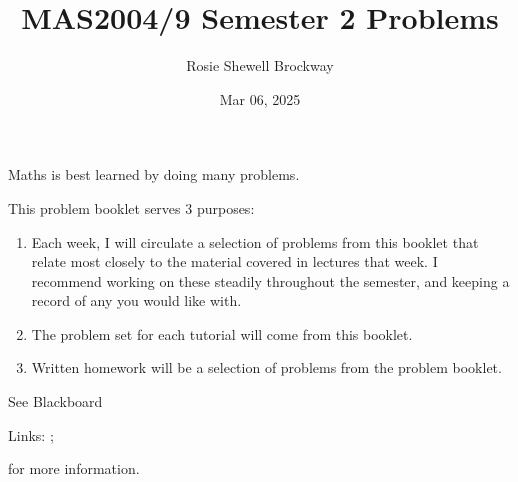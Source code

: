 \documentclass[letterpaper,10pt,english]{jupyterBook}
\title{MAS2004/9 Semester 2 Problems}
\date{Mar 06, 2025}
\author{Rosie Shewell Brockway}
\begin{document}
\pagestyle{empty}
\sphinxmaketitle
\pagestyle{plain}
\sphinxtableofcontents
\pagestyle{normal}
\label{\detokenize{intro::doc}}


\sphinxAtStartPar
Maths is best learned by doing many problems.

\sphinxAtStartPar
This problem booklet serves 3 purposes:

\label{\detokenize{intro:pow}}\begin{enumerate}
%
\item {} 
\sphinxAtStartPar
{} 
Each week, I will circulate a selection of problems from this booklet that relate most closely to the material covered in lectures that week. I recommend working on these steadily throughout the semester, and keeping a record of any you would like  with.

\item {} 
\sphinxAtStartPar
{} 
The problem set for each tutorial will come from this booklet.

\item {} 
\sphinxAtStartPar
{} 
Written homework will be a selection of problems from the problem booklet. 

\end{enumerate}

\sphinxAtStartPar
See Blackboard%
\begin{footnote}[1]\sphinxAtStartFootnote
Links: ; 
%
\end{footnote} for more information.



\begin{DUlineblock}{0em}
\item[] 
\end{DUlineblock}

\sphinxAtStartPar
{\hyperref[\detokenize{Problems:prob}]{}} 
  {\hyperref[\detokenize{Problems:ch1prob}]{}} 
  {\hyperref[\detokenize{Problems:ch2prob}]{}} 
  {\hyperref[\detokenize{Problems:ch3prob}]{}} 
  {\hyperref[\detokenize{Problems:ch4prob}]{}} 
  {\hyperref[\detokenize{Problems:ch5prob}]{}} 
  {\hyperref[\detokenize{Problems:ch6prob}]{}}
\end{document}
